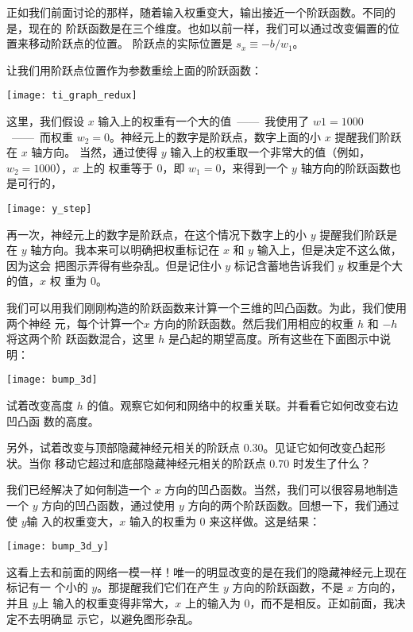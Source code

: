 正如我们前面讨论的那样，随着输入权重变大，输出接近一个阶跃函数。不同的是，现在的
阶跃函数是在三个维度。也如以前一样，我们可以通过改变偏置的位置来移动阶跃点的位置。
阶跃点的实际位置是 $s_x \equiv -b / w_1$。

让我们用阶跃点位置作为参数重绘上面的阶跃函数：
\begin{center}
  \texttt{[image: ti\_graph\_redux]}
\end{center}

这里，我们假设 $x$ 输入上的权重有一个大的值~——~我使用了 $w1 = 1000$~——~而权重
$w_2 = 0$。神经元上的数字是阶跃点，数字上面的小 $x$ 提醒我们阶跃在 $x$ 轴方向。
当然，通过使得 $y$ 输入上的权重取一个非常大的值（例如，$w_2 = 1000$），$x$ 上的
权重等于 $0$，即 $w_1 = 0$，来得到一个 $y$ 轴方向的阶跃函数也是可行的，
\begin{center}
  \texttt{[image: y\_step]}
\end{center}

再一次，神经元上的数字是阶跃点，在这个情况下数字上的小 $y$ 提醒我们阶跃是在 $y$
轴方向。我本来可以明确把权重标记在 $x$ 和 $y$ 输入上，但是决定不这么做，因为这会
把图示弄得有些杂乱。但是记住小 $y$ 标记含蓄地告诉我们 $y$ 权重是个大的值，$x$ 权
重为 $0$。

我们可以用我们刚刚构造的阶跃函数来计算一个三维的凹凸函数。为此，我们使用两个神经
元，每个计算一个$x$ 方向的阶跃函数。然后我们用相应的权重 $h$ 和 $-h$ 将这两个阶
跃函数混合，这里 $h$ 是凸起的期望高度。所有这些在下面图示中说明：
\begin{center}
  \texttt{[image: bump\_3d]}
\end{center}

试着改变高度 $h$ 的值。观察它如何和网络中的权重关联。并看看它如何改变右边凹凸函
数的高度。

另外，试着改变与顶部隐藏神经元相关的阶跃点 $0.30$。见证它如何改变凸起形状。当你
移动它超过和底部隐藏神经元相关的阶跃点 $0.70$ 时发生了什么？

我们已经解决了如何制造一个 $x$ 方向的凹凸函数。当然，我们可以很容易地制造一个
$y$ 方向的凹凸函数，通过使用 $y$ 方向的两个阶跃函数。回想一下，我们通过使 $y$输
入的权重变大，$x$ 输入的权重为 $0$ 来这样做。这是结果：
\begin{center}
  \texttt{[image: bump\_3d\_y]}
\end{center}

这看上去和前面的网络一模一样！唯一的明显改变的是在我们的隐藏神经元上现在标记有一
个小的 $y$。那提醒我们它们在产生 $y$ 方向的阶跃函数，不是 $x$ 方向的，并且 $y$上
输入的权重变得非常大，$x$ 上的输入为 $0$，而不是相反。正如前面，我决定不去明确显
示它，以避免图形杂乱。

